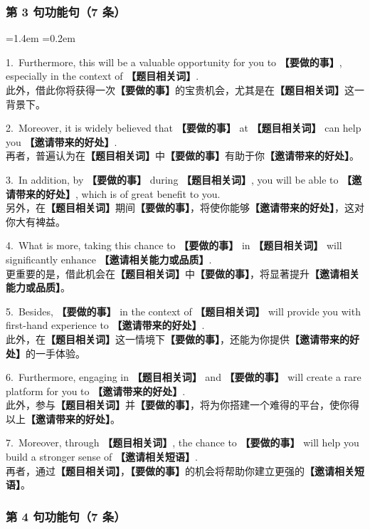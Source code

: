 \documentclass[11pt,a4paper]{ctexart}
\newcommand{\fillin}[1]{{\bfseries【#1】}}
\newenvironment{eg}{%
  \par\addvspace{4pt}%
  \begin{list}{}{\leftmargin=1.4em \rightmargin=0.2em \listparindent=0pt
    \itemindent=0pt \topsep=0pt \parsep=2pt \itemsep=2pt \partopsep=0pt}%
  \item\relax
}{%
  \end{list}\addvspace{5pt}%
}
\begin{document}
\subsubsection{第 3 句功能句（7 条）}

\begin{eg}
1.\ Furthermore, this will be a valuable opportunity for you to \fillin{要做的事}, especially in the context of \fillin{题目相关词}.\\
此外，借此你将获得一次\fillin{要做的事}的宝贵机会，尤其是在\fillin{题目相关词}这一背景下。

2.\ Moreover, it is widely believed that \fillin{要做的事} at \fillin{题目相关词} can help you \fillin{邀请带来的好处}.\\
再者，普遍认为在\fillin{题目相关词}中\fillin{要做的事}有助于你\fillin{邀请带来的好处}。

3.\ In addition, by \fillin{要做的事} during \fillin{题目相关词}, you will be able to \fillin{邀请带来的好处}, which is of great benefit to you.\\
另外，在\fillin{题目相关词}期间\fillin{要做的事}，将使你能够\fillin{邀请带来的好处}，这对你大有裨益。

4.\ What is more, taking this chance to \fillin{要做的事} in \fillin{题目相关词} will significantly enhance \fillin{邀请相关能力或品质}.\\
更重要的是，借此机会在\fillin{题目相关词}中\fillin{要做的事}，将显著提升\fillin{邀请相关能力或品质}。

5.\ Besides, \fillin{要做的事} in the context of \fillin{题目相关词} will provide you with first-hand experience to \fillin{邀请带来的好处}.\\
此外，在\fillin{题目相关词}这一情境下\fillin{要做的事}，还能为你提供\fillin{邀请带来的好处}的一手体验。

6.\ Furthermore, engaging in \fillin{题目相关词} and \fillin{要做的事} will create a rare platform for you to \fillin{邀请带来的好处}.\\
此外，参与\fillin{题目相关词}并\fillin{要做的事}，将为你搭建一个难得的平台，使你得以上\fillin{邀请带来的好处}。

7.\ Moreover, through \fillin{题目相关词}, the chance to \fillin{要做的事} will help you build a stronger sense of \fillin{邀请相关短语}.\\
再者，通过\fillin{题目相关词}，\fillin{要做的事}的机会将帮助你建立更强的\fillin{邀请相关短语}。
\end{eg}

\subsubsection{第 4 句功能句（7 条）}
\end{document}
